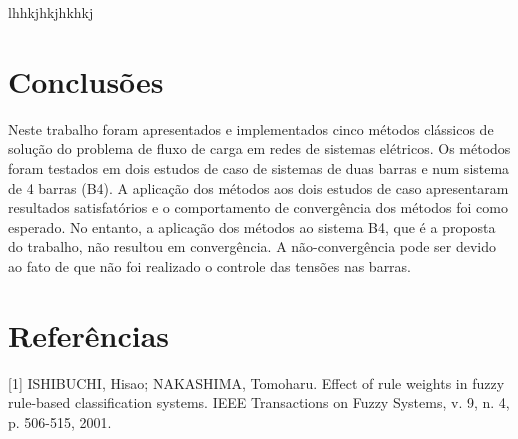 \documentclass[12pt,a4paper]{article}
\numberwithin{equation}{section}
\begin{document}
lhhkjhkjhkhkj

\newpage
\section{Conclusões}

Neste trabalho foram apresentados e implementados cinco métodos clássicos de solução
do problema de fluxo de carga em redes de sistemas elétricos.
Os métodos foram testados em dois estudos de caso de sistemas de duas barras e num sistema
de 4 barras (B4).
A aplicação dos métodos aos dois estudos de caso apresentaram resultados satisfatórios
e o comportamento de convergência dos métodos foi como esperado. 
No entanto, a aplicação dos métodos ao sistema B4, que é a proposta do trabalho, não 
resultou em convergência. A não-convergência pode ser devido ao fato de que não foi
realizado o controle das tensões nas barras. 

\newpage

\section*{Referências}
%

[1] ISHIBUCHI, Hisao; NAKASHIMA, Tomoharu. Effect of rule weights in fuzzy rule-based classification systems. IEEE Transactions on Fuzzy Systems, v. 9, n. 4, p. 506-515, 2001.
\end{document}
